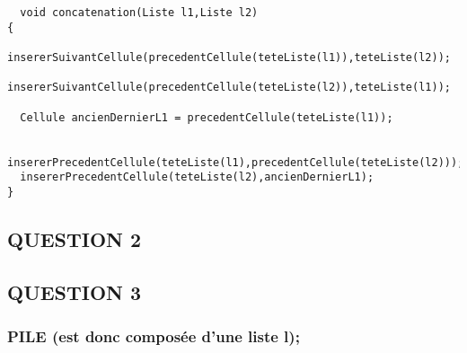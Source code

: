 \documentclass[11pt]{article}
\begin{document}
\begin{lstlisting}
  void concatenation(Liste l1,Liste l2)
{
  insererSuivantCellule(precedentCellule(teteListe(l1)),teteListe(l2));
  insererSuivantCellule(precedentCellule(teteListe(l2)),teteListe(l1));

  Cellule ancienDernierL1 = precedentCellule(teteListe(l1));

  insererPrecedentCellule(teteListe(l1),precedentCellule(teteListe(l2)));
  insererPrecedentCellule(teteListe(l2),ancienDernierL1);
} 
\end{lstlisting}

\subsection{QUESTION 2}
\label{sec:orgbbaae81}
\subsection{QUESTION 3}
\label{sec:orgcd12433}

\subsubsection{PILE (est donc composée d'une liste l);}
\label{sec:org52ffc25}
\end{document}
